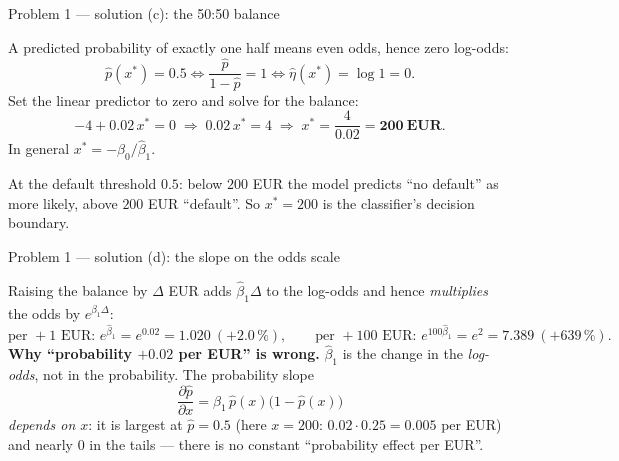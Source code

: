 \documentclass[aspectratio=169,11pt]{beamer}
\begin{document}
\begin{frame}{Problem 1 --- solution (c): the 50:50 balance}
  \begin{solutionbox}
    A predicted probability of exactly one half means even odds, hence zero log-odds:
    \[
      \hat{p}(x^{*})=0.5
      \iff \frac{\hat{p}}{1-\hat{p}}=1
      \iff \hat{\eta}(x^{*})=\log 1=0 .
    \]
    Set the linear predictor to zero and solve for the balance:
    \[
      -4+0.02\,x^{*}=0
      \;\Longrightarrow\;
      0.02\,x^{*}=4
      \;\Longrightarrow\;
      x^{*}=\frac{4}{0.02}=\mathbf{200\ \text{EUR}} .
    \]
    In general $x^{*}=-\hat{\beta}_0/\hat{\beta}_1$.
  \end{solutionbox}
  \begin{takeaway}
    At the default threshold $0.5$: below $200$ EUR the model predicts ``no default'' as
    more likely, above $200$ EUR ``default''. So $x^{*}=200$ is the classifier's decision
    boundary.
  \end{takeaway}
\end{frame}

\begin{frame}{Problem 1 --- solution (d): the slope on the odds scale}
  \begin{solutionbox}
    Raising the balance by $\Delta$ EUR adds $\hat{\beta}_1\Delta$ to the log-odds and hence
    \emph{multiplies} the odds by $e^{\hat{\beta}_1\Delta}$:
    \[
      \text{per }+1\text{ EUR: } e^{\hat{\beta}_1}=e^{0.02}=\mathbf{1.020}\ (+2.0\,\%),
      \qquad
      \text{per }+100\text{ EUR: } e^{100\hat{\beta}_1}=e^{2}=\mathbf{7.389}\ (+639\,\%).
    \]
    \textbf{Why ``probability $+0.02$ per EUR'' is wrong.} $\hat{\beta}_1$ is the change in
    the \emph{log-odds}, not in the probability. The probability slope
    \[
      \frac{\partial \hat{p}}{\partial x}=\hat{\beta}_1\,\hat{p}(x)\bigl(1-\hat{p}(x)\bigr)
    \]
    \emph{depends on $x$}: it is largest at $\hat{p}=0.5$ (here $x=200$:
    $0.02\cdot 0.25=0.005$ per EUR) and nearly $0$ in the tails --- there is no constant
    ``probability effect per EUR''.
  \end{solutionbox}
\end{frame}
\end{document}
